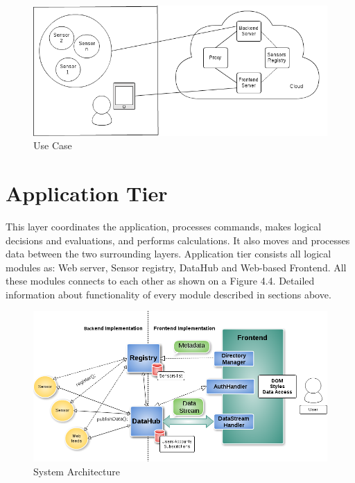         \begin{figure}[!ht]
        \centering
        \includegraphics[scale=0.6]{images/User_Case.png}   
        \caption[Use Case]{Use Case}
        \label{img:structure}                           
        \end{figure}

\section{Application Tier}
  This layer coordinates the application, processes commands, makes logical decisions and evaluations, and performs calculations. It also moves and processes data between the two surrounding layers.
  \newline
  Application tier consists all logical modules as: Web server, Sensor registry, DataHub and Web-based Frontend. All these modules connects to each other as shown on a Figure 4.4. Detailed information about functionality of every module described in sections above.
    \begin{figure}[!ht]
    \centering
    \includegraphics[scale=0.6]{images/Structure.png}   
    \caption[System Architecture]{System Architecture}
    \label{img:structure}                           
    \end{figure}


